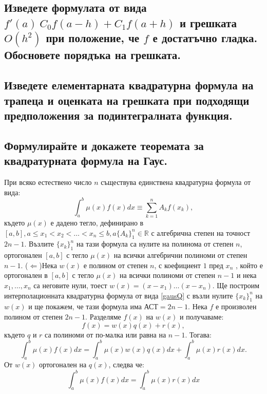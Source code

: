 \documentclass[12pt]{article}
\numberwithin{equation}{subsection}
\numberwithin{theorem}{subsection}
\numberwithin{definition}{subsection}
\numberwithin{corollary}{subsection}
\begin{document}
\subsection{Изведете формулата от вида $f'(a) ~ C_0 f(a - h) + C_1 f(a + h)$ и грешката $O(h^2)$ при положение, че $f$ е достатъчно гладка.
        Обосновете порядъка на грешката.}

\subsection{Изведете елементарната квадратурна формула на трапеца и оценката на грешката при подходящи предположения за подинтегралната функция.}

\subsection{Формулирайте и докажете теоремата за квадратурната формула на Гаус.}
  \theorem При всяко естествено число $n$ съществува единствена квадратурна формула от вида:
    \begin{equation}\label{gausQ}
      \int_{a}^{b}\mu(x)f(x)dx\equiv\sum_{k=1}^{n}A_kf(x_k),
    \end{equation}
  където $\mu(x)$ е дадено тегло, дефинирано в $[a,b], a\leq x_1<x_2<\ldots<x_n\leq b, a \{A_k\}_1^n\in\mathbb R$ с алгебрична степен на точност $2n-1$. Възлите $\{x_k\}_1^n$ на тази формула са нулите на полинома от степен $n$, ортогонален $[a,b]$ с тегло $\mu(x)$ на всички алгебрични полиноми от степен $n-1$.
  \proof
  ($\Leftarrow$)Нека $w(x)$ е полином от степен $n$, с коефициент $1$ пред $x_n$ , който е ортогонален в $[a,b]$ с тегло $\mu(x)$ на всички полиноми от степен $n-1$ и нека $x_1,\ldots,x_n$ са неговите нули, тоест $w(x) = (x-x_1)\ldots(x-x_n)$. Ще построим интерполационната квадратурна формула от вида \ref{gausQ} с възли нулите $\{x_k\}_1^n$ на $w(x)$ и  ще покажем, че тази формула има АСТ$=2n-1$.
  Нека $f$ е произволен полином от степен $2n-1$. Разделяме $f(x)$ на $w(x)$ и получаваме:
  \begin{equation}
    f(x)=w(x)q(x)+r(x),
  \end{equation}
  където $q$ и $r$ са полиноми от по-малка или равна на $n-1$. Тогава:
  \begin{equation*}
    \int_{a}^{b}\mu(x)f(x)dx=\int_{a}^{b}\mu(x)w(x)q(x)dx+\int_{a}^{b}\mu(x)r(x)dx.
  \end{equation*}
  От $w(x)$ ортогонален на $q(x)$, следва че:
  \begin{equation*}
    \int_{a}^{b}\mu(x)f(x)dx=\int_{a}^{b}\mu(x)r(x)dx
  \end{equation*}
\end{document}
